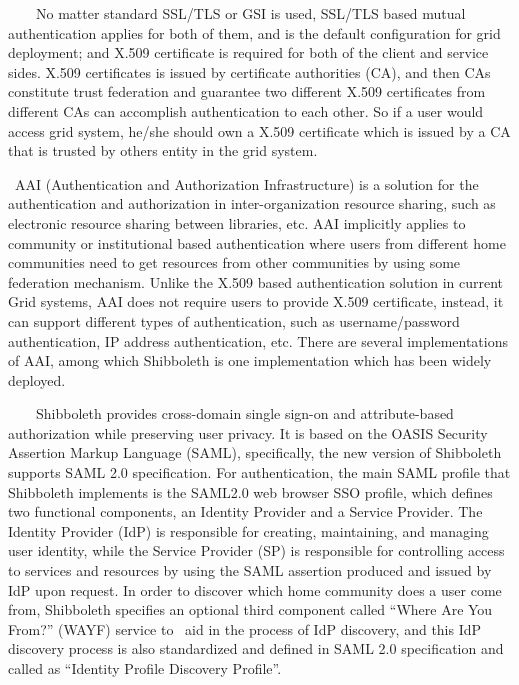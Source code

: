 \documentclass{article}
\begin{document}
{\color{black}
\ \ \ \ No matter standard SSL/TLS or GSI is used, SSL/TLS based mutual
authentication applies for both of them, and is the default
configuration for grid deployment; and X.509 certificate is required
for both of the client and service sides. X.509 certificates is issued
by certificate authorities (CA), and then CAs constitute trust
federation and guarantee two different X.509 certificates from
different CAs can accomplish authentication to each other. So if a user
would access grid system, he/she should own a X.509 certificate which
is issued by a CA that is trusted by other{\textquotesingle}s entity in
the grid system.}

{\upshape\color{black}
\ AAI (Authentication and Authorization Infrastructure) is a solution
for the authentication and authorization in inter-organization resource
sharing, such as electronic resource sharing between libraries, etc.
AAI implicitly applies to community or institutional based
authentication where users from different home communities need to get
resources from other communities by using some federation mechanism.
Unlike the X.509 based authentication solution in current Grid systems,
AAI does not require users to provide X.509 certificate, instead, it
can support different types of authentication, such as
username/password authentication, IP address authentication, etc. There
are several implementations of AAI, among which Shibboleth is one
implementation which has been widely deployed.}

{\upshape\color{black}
\ \ \ \ Shibboleth provides cross-domain single sign-on and
attribute-based authorization while preserving user privacy. It is
based on the OASIS Security Assertion Markup Language (SAML),
specifically, the new version of Shibboleth supports SAML 2.0
specification. For authentication, the main SAML profile that
Shibboleth implements is the SAML2.0 web browser SSO profile, which
defines two functional components, an Identity Provider and a Service
Provider. The Identity Provider (IdP) is responsible for creating,
maintaining, and managing user identity, while the Service Provider
(SP) is responsible for controlling access to services and resources by
using the SAML assertion produced and issued by IdP upon request. In
order to discover which home community does a user come from,
Shibboleth specifies an optional third component called
{\textquotedblleft}Where Are You From?{\textquotedblright} (WAYF)
service to \ aid in the process of IdP discovery, and this IdP
discovery process is also standardized and defined in SAML 2.0
specification and called as {\textquotedblleft}Identity Profile
Discovery Profile{\textquotedblright}.}
\end{document}
